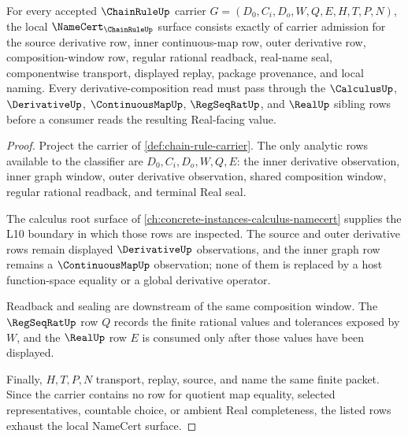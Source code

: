 \begin{theorem}
\label{thm:chain-rule-namecert-obligations}
For every accepted $\ChainRuleUp$ carrier $G=(D_0,C_i,D_o,W,Q,E,H,T,P,N)$, the local $\NameCert_{\ChainRuleUp}$ surface consists exactly of carrier admission for the source derivative row, inner continuous-map row, outer derivative row, composition-window row, regular rational readback, real-name seal, componentwise transport, displayed replay, package provenance, and local naming. Every derivative-composition read must pass through the $\CalculusUp$, $\DerivativeUp$, $\ContinuousMapUp$, $\RegSeqRatUp$, and $\RealUp$ sibling rows before a consumer reads the resulting Real-facing value.
\end{theorem}
\begin{proof}
Project the carrier of \autoref{def:chain-rule-carrier}. The only analytic rows available to the classifier are $D_0,C_i,D_o,W,Q,E$: the inner derivative observation, inner graph window, outer derivative observation, shared composition window, regular rational readback, and terminal Real seal.

The calculus root surface of \autoref{ch:concrete-instances-calculus-namecert} supplies the L10 boundary in which those rows are inspected. The source and outer derivative rows remain displayed $\DerivativeUp$ observations, and the inner graph row remains a $\ContinuousMapUp$ observation; none of them is replaced by a host function-space equality or a global derivative operator.

Readback and sealing are downstream of the same composition window. The $\RegSeqRatUp$ row $Q$ records the finite rational values and tolerances exposed by $W$, and the $\RealUp$ row $E$ is consumed only after those values have been displayed.

Finally, $H,T,P,N$ transport, replay, source, and name the same finite packet. Since the carrier contains no row for quotient map equality, selected representatives, countable choice, or ambient Real completeness, the listed rows exhaust the local NameCert surface.
\end{proof}

